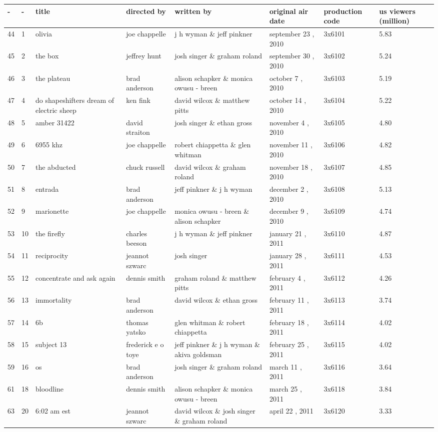 \documentclass{article}
\begin{document}
\begin{tabular}{llllllll}
\toprule
 - & - & title & directed by & written by & original air date & production code & us viewers (million) \\
\midrule
44 & 1 & olivia & joe chappelle & j h wyman \& jeff pinkner & september 23 , 2010 & 3x6101 & 5.83 \\
45 & 2 & the box & jeffrey hunt & josh singer \& graham roland & september 30 , 2010 & 3x6102 & 5.24 \\
46 & 3 & the plateau & brad anderson & alison schapker \& monica owusu - breen & october 7 , 2010 & 3x6103 & 5.19 \\
47 & 4 & do shapeshifters dream of electric sheep & ken fink & david wilcox \& matthew pitts & october 14 , 2010 & 3x6104 & 5.22 \\
48 & 5 & amber 31422 & david straiton & josh singer \& ethan gross & november 4 , 2010 & 3x6105 & 4.80 \\
49 & 6 & 6955 khz & joe chappelle & robert chiappetta \& glen whitman & november 11 , 2010 & 3x6106 & 4.82 \\
50 & 7 & the abducted & chuck russell & david wilcox \& graham roland & november 18 , 2010 & 3x6107 & 4.85 \\
51 & 8 & entrada & brad anderson & jeff pinkner \& j h wyman & december 2 , 2010 & 3x6108 & 5.13 \\
52 & 9 & marionette & joe chappelle & monica owusu - breen \& alison schapker & december 9 , 2010 & 3x6109 & 4.74 \\
53 & 10 & the firefly & charles beeson & j h wyman \& jeff pinkner & january 21 , 2011 & 3x6110 & 4.87 \\
54 & 11 & reciprocity & jeannot szwarc & josh singer & january 28 , 2011 & 3x6111 & 4.53 \\
55 & 12 & concentrate and ask again & dennis smith & graham roland \& matthew pitts & february 4 , 2011 & 3x6112 & 4.26 \\
56 & 13 & immortality & brad anderson & david wilcox \& ethan gross & february 11 , 2011 & 3x6113 & 3.74 \\
57 & 14 & 6b & thomas yatsko & glen whitman \& robert chiappetta & february 18 , 2011 & 3x6114 & 4.02 \\
58 & 15 & subject 13 & frederick e o toye & jeff pinkner \& j h wyman \& akiva goldsman & february 25 , 2011 & 3x6115 & 4.02 \\
59 & 16 & os & brad anderson & josh singer \& graham roland & march 11 , 2011 & 3x6116 & 3.64 \\
61 & 18 & bloodline & dennis smith & alison schapker \& monica owusu - breen & march 25 , 2011 & 3x6118 & 3.84 \\
63 & 20 & 6:02 am est & jeannot szwarc & david wilcox \& josh singer \& graham roland & april 22 , 2011 & 3x6120 & 3.33 \\
\bottomrule
\end{tabular}
\end{document}
